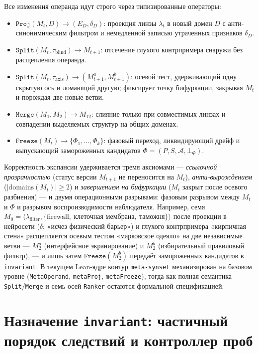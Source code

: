 \documentclass[11pt,a4paper]{article}
\theoremstyle{preprintthm}
\theoremstyle{preprintdef}
\begin{document}
Все изменения операнда идут строго через типизированные операторы:
\begin{itemize}
  \item $\texttt{Proj}(M_t, D) \to (E_D, \delta_D)$: проекция линзы $\lambda_t$ в новый домен $D$ с анти-синонимическим фильтром и немедленной записью утраченных признаков $\delta_D$.
  \item $\texttt{Split}(M_t, \tau_{\mathrm{blind}}) \to M_{t+1}$: отсечение глухого контрпримера снаружи без расщепления операнда.
  \item $\texttt{Split}(M_t, \tau_{\mathrm{axis}}) \to (M_{t+1}^a, M_{t+1}^b)$: осевой тест, удерживающий одну скрытую ось и ломающий другую; фиксирует точку бифуркации, закрывая $M_t$ и порождая две новые ветви.
  \item $\texttt{Merge}(M_1, M_2) \to M_{12}$: слияние только при совместимых линзах и совпадении выделяемых структур на общих доменах.
  \item $\texttt{Freeze}(M_t) \to \{\Phi_1,\dots,\Phi_k\}$: фазовый переход, ликвидирующий дрейф и выпускающий замороженных кандидатов $\Phi=(P,S,\mathcal{A},\bot_\Phi)$.
\end{itemize}

Корректность экспансии удерживается тремя аксиомами --- \emph{ссылочной прозрачностью} (статус версии $M_{t+1}$ не переносится на $M_t$), \emph{анти-вырождением} ($|\mathrm{domains}(M_t)|\ge 2$) и \emph{завершением на бифуркации} ($M_t$ закрыт после осевого разбиения) --- и двумя операционными разрывами: фазовым разрывом между $M_t$ и $\Phi$ и разрывом воспроизводимости наблюдателя. Например, семя $M_0=\langle\lambda_{\mathrm{filter}},\{\text{firewall},\ \text{клеточная мембрана},\ \text{таможня}\}\rangle$ после проекции в нейросети ($\delta$: «исчез физический барьер») и глухого контрпримера «кирпичная стена» расщепляется осевым тестом «марковское одеяло» на две независимые ветви --- $M_2^a$ (интерфейсное экранирование) и $M_2^b$ (избирательный правиловый фильтр), --- и лишь затем $\texttt{Freeze}(M_2^b)$ передаёт замороженных кандидатов в \texttt{invariant}. В текущем Lean-ядре контур \texttt{meta-synset} механизирован на базовом уровне (\texttt{MetaOperand}, \texttt{metaProj}, \texttt{metaFreeze}), тогда как полная семантика \texttt{Split}/\texttt{Merge} и семь осей \texttt{Ranker} остаются формальной спецификацией.

\section{Назначение \texorpdfstring{\texttt{invariant}}{invariant}: частичный порядок следствий и контроллер проб}
\end{document}
